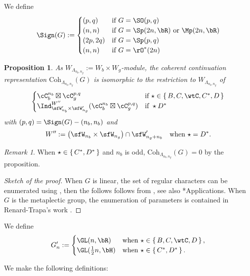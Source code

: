 \documentclass[12pt,a4paper]{amsart}
\numberwithin{equation}{section}
\newtheorem{prop}[thm]{Proposition}
\theoremstyle{remark}
\newtheorem{remark}[thm]{Remark}
\def\half{{\tfrac{1}{2}}}
\def\Coh{\mathrm{Coh}}
\begin{document}
We define
\[
  \Sign(G):= \begin{cases}
    (p,q) & \text{if } G = \SO(p,q)\\
    (n,n) & \text{if } G = \Sp(2n,\bR) \text{ or } \Mp(2n,\bR)\\
    (2p,2q) & \text{if } G = \Sp(p,q) \\
    (n,n) & \text{if } G = \rO^{*}(2n) \\
  \end{cases}
\]

\begin{prop}
  As $W_{\Lambda_{n_{b},n_{g}}}:= W_{b}\times W_{g}$-module, the coherent
  continuation representation $\Coh_{\Lambda_{n_{b},n_{g}}}(G)$ is isomorphic to
  the restriction to $W_{\Lambda_{n_{b},n_{g}}}$ of
  \[
    \begin{cases}
      \cC_{b}^{n_{b}}\boxtimes\cC_{g}^{p,q} & \text{if } \star \in \set{B,C,\wtC,C^{*},D}\\
      \Ind_{\sfW'_{n_{b}}\times \sfW'_{n_{g}}}^{W''}(\cC_{b}^{n_{b}}\boxtimes\cC_{g}^{p,q}) & \text{if } \star D^{*}\\
    \end{cases}
  \]
  with $(p,q) = \Sign(G) - (n_{b},n_{b})$ and
  \[
    W'' := \left(\sfW_{n_{b}}\times \sfW_{n_{g}}\right)\cap \sfW'_{n_{g}+n_{b}} \quad \text{when
      $\star = D^{*}$.}
  \]


\end{prop}
\begin{remark}
  When $\star \in \set{C^{*},D^{*}}$ and $n_{b}$ is odd,
  $\Coh_{\Lambda_{n_{b},n_{g}}}(G)=0$ by the proposition.
\end{remark}
\begin{proof}[Sketch of the proof]
  When $G$ is linear, the set of regular characters can be enumerated using
  \cite{AC}, then the follows follows from , see also
  \cite{Mc}*{Applications}. When $G$ is the metaplectic group, the enumeration
  of parameters is contained in Renard-Trapa's work \cite{RT1,RT2}.
\end{proof}

We define
\[
  G'_{n} := \begin{cases}
    \GL(n,\bR) & \text{when } \star \in \set{B,C,\wtC,D}, \\
    \GL(\half n,\bH) & \text{when } \star \in \set{C^{*},D^{*}}. \\
  \end{cases}
\]


We make the following definitions:
\end{document}
